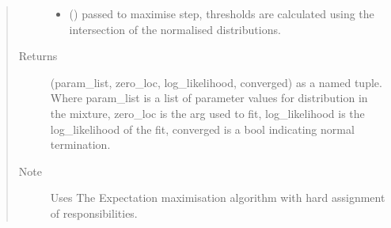 \documentclass[letterpaper,10pt,english]{sphinxmanual}
\begin{document}
\begin{fulllineitems}
\begin{quote}
\begin{description}
\begin{itemize}
\item {} 
\sphinxAtStartPar
{} () \textendash{} passed to maximise step, thresholds are calculated
using the intersection of the normalised distributions.

\end{itemize}

\item[{Returns}] \leavevmode
\sphinxAtStartPar
(param\_list, zero\_loc, log\_likelihood, converged) as a named tuple.
Where param\_list is a list of parameter values for distribution in
the mixture, zero\_loc is the arg used to fit, log\_likelihood is the
log\_likelihood of the fit, converged is a bool indicating normal
termination.

\item[{Note}] \leavevmode
\sphinxAtStartPar
Uses The Expectation maximisation algorithm with hard assignment of
responsibilities.

\end{description}\end{quote}

\end{fulllineitems}


\begin{fulllineitems}
\label{\detokenize{tes:tes.analysis.fit_state_least_squares}}
\end{fulllineitems}

\end{document}
